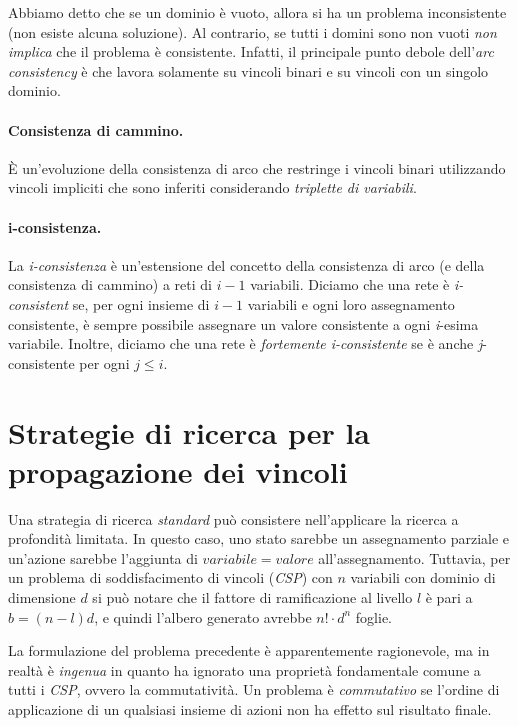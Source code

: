 \documentclass[11pt,oneside]{book}
\begin{document}
Abbiamo detto che se un dominio è vuoto, allora si ha un problema inconsistente (non esiste alcuna soluzione). Al contrario, se tutti i domini sono non vuoti \textit{non implica} che il problema è consistente. Infatti, il principale punto debole dell'\textit{arc consistency} è che lavora solamente su vincoli binari e su vincoli con un singolo dominio.

\paragraph{Consistenza di cammino.}
\`{E} un'evoluzione della consistenza di arco che restringe i vincoli binari utilizzando vincoli impliciti che sono inferiti considerando \textit{triplette di variabili}.

\paragraph{i-consistenza.}
La \textit{i-consistenza} è un'estensione del concetto della consistenza di arco (e della consistenza di cammino) a reti di $i-1$ variabili. Diciamo che una rete è \textit{i-consistent} se, per ogni insieme di $i-1$ variabili e ogni loro assegnamento consistente, è sempre possibile assegnare un valore consistente a ogni \textit{i}-esima variabile. Inoltre, diciamo che una rete è \textit{fortemente i-consistente} se è anche \textit{j}-consistente per ogni $j \leq i$.


\section{Strategie di ricerca per la propagazione dei vincoli}
Una strategia di ricerca \textit{standard} può consistere nell'applicare la ricerca a profondità limitata. In questo caso, uno stato sarebbe un assegnamento parziale e un'azione sarebbe l'aggiunta di $variabile = valore$ all'assegnamento. Tuttavia, per un problema di soddisfacimento di vincoli (\textit{CSP}) con $n$ variabili con dominio di dimensione $d$ si può notare che il fattore di ramificazione al livello $l$ è pari a $b = (n - l) d$, e quindi l'albero generato avrebbe $n! \cdot d^n$ foglie.

La formulazione del problema precedente è apparentemente ragionevole, ma in realtà è \textit{ingenua} in quanto ha ignorato una proprietà fondamentale comune a tutti i \textit{CSP}, ovvero la commutatività. Un problema è \textit{commutativo} se l'ordine di applicazione di un qualsiasi insieme di azioni non ha effetto sul risultato finale.
\end{document}
